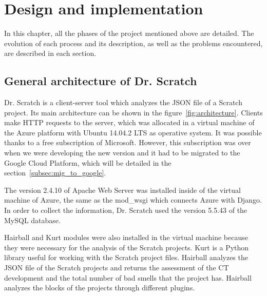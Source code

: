 

\cleardoublepage
\chapter{Design and implementation}
\label{chap:implementation}

In this chapter, all the phases of the project mentioned above are detailed. The evolution of each process and its description, as well as the problems encountered, are described in each section.


\section{General architecture of Dr. Scratch} 
\label{sec:arquitectura}

Dr. Scratch is a client-server tool which analyzes the JSON file of a Scratch project. Its main architecture can be shown in the figure~\ref{fig:architecture}. Clients make HTTP requests to the server, which was allocated in a virtual machine of the Azure platform with Ubuntu 14.04.2 LTS as operative system. It was possible thanks to a free subscription of Microsoft. However, this subscription was over when we were developing the new version and it had to be migrated to the Google Cloud Platform, which will be detailed in the section~\ref{subsec:mig_to_google}. 

The version 2.4.10 of Apache Web Server was installed inside of the virtual machine of Azure, the same as the mod\_wsgi which connects Azure with Django. In order to collect the information, Dr. Scratch used the version 5.5.43 of the MySQL database. 

Hairball and Kurt modules were also installed in the virtual machine because they were necessary for the analysis of the Scratch projects. Kurt is a Python library useful for working with the Scratch project files. Hairball analyzes the JSON file of the Scratch projects and returns the assessment of the CT development and the total number of bad smells that the project has. Hairball analyzes the blocks of the projects through different plugins.

